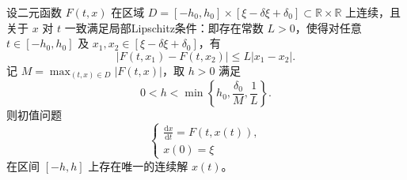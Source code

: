 \documentclass[../../main.tex]{subfiles}%
\begin{document}
\begin{theorem}[常微分方程初值问题的局部存在唯一性定理]\label{theorem:常微分方程初值问题解的局部存在唯一性}
设二元函数 $F(t,x)$ 在区域 $D = [-h_0,h_0] \times [\xi-\delta\xi+\delta_0] \subset \mathbb{R} \times \mathbb{R}$ 上连续，且关于 $x$ 对 $t$ 一致满足局部Lipschitz条件：即存在常数 $L>0$，使得对任意 $t\in[-h_0,h_0]$ 及 $x_1,x_2\in[\xi-\delta\xi+\delta_0]$，有
\[
|F(t,x_1) - F(t,x_2)| \leqslant L |x_1 - x_2|.
\]
记 $M = \max_{(t,x)\in D} |F(t,x)|$，取 $h>0$ 满足
\[
0 < h < \min\left\{ h_0, \frac{\delta_0}{M}, \frac{1}{L} \right\}.
\]
则初值问题
\[
\begin{cases}
\frac{\mathrm{d}x}{\mathrm{d}t} = F(t,x(t)), \\
x(0) = \xi
\end{cases}
\]
在区间 $[-h,h]$ 上存在唯一的连续解 $x(t)$。
\end{theorem}
\end{document}
